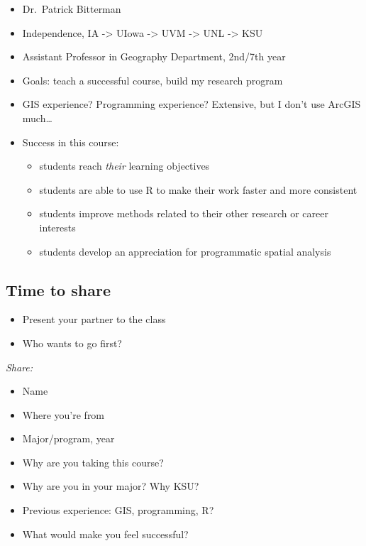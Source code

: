\documentclass[
  letterpaper,
  DIV=11,
  numbers=noendperiod]{scrartcl}
\providecommand{\tightlist}{%
  \setlength{\itemsep}{0pt}\setlength{\parskip}{0pt}}
\begin{document}
\begin{itemize}
\tightlist
\item
  Dr.~Patrick Bitterman
\item
  Independence, IA -\textgreater{} UIowa -\textgreater{} UVM
  -\textgreater{} UNL -\textgreater{} KSU
\item
  Assistant Professor in Geography Department, 2nd/7th year
\item
  Goals: teach a successful course, build my research program
\item
  GIS experience? Programming experience? Extensive, but I don't use
  ArcGIS much\ldots{}
\item
  Success in this course:

  \begin{itemize}
  \tightlist
  \item
    students reach \emph{their} learning objectives
  \item
    students are able to use R to make their work faster and more
    consistent
  \item
    students improve methods related to their other research or career
    interests
  \item
    students develop an appreciation for programmatic spatial analysis
  \end{itemize}
\end{itemize}

\subsection{Time to share}\label{time-to-share}

\begin{itemize}
\tightlist
\item
  Present your partner to the class
\item
  Who wants to go first?
\end{itemize}

\emph{Share:}

\begin{itemize}
\item
  Name
\item
  Where you're from
\item
  Major/program, year
\item
  Why are you taking this course?
\item
  Why are you in your major? Why KSU?
\item
  Previous experience: GIS, programming, R?
\item
  What would make you feel successful?
\end{itemize}
\end{document}
